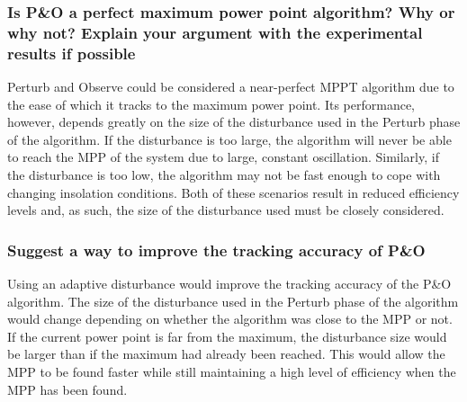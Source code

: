 \documentclass[]{article}
\begin{document}
 			\subsubsection{Is P\&O a perfect maximum power point algorithm? Why or why not? Explain your argument with the experimental results if possible}
 				Perturb and Observe could be considered a near-perfect MPPT algorithm due to the ease of which it tracks to the maximum power point. Its performance, however, depends greatly on the size of the disturbance used in the Perturb phase of the algorithm. If the disturbance is too large, the algorithm will never be able to reach the MPP of the system due to large, constant oscillation. Similarly, if the disturbance is too low, the algorithm may not be fast enough to cope with changing insolation conditions. Both of these scenarios result in reduced efficiency levels and, as such, the size of the disturbance used must be closely considered.
 			\subsubsection{Suggest a way to improve the tracking accuracy of P\&O}
 				Using an adaptive disturbance would improve the tracking accuracy of the P\&O algorithm. The size of the disturbance used in the Perturb phase of the algorithm would change depending on whether the algorithm was close to the MPP or not. If the current power point is far from the maximum, the disturbance size would be larger than if the maximum had already been reached. This would allow the MPP to be found faster while still maintaining a high level of efficiency when the MPP has been found.
\end{document}
